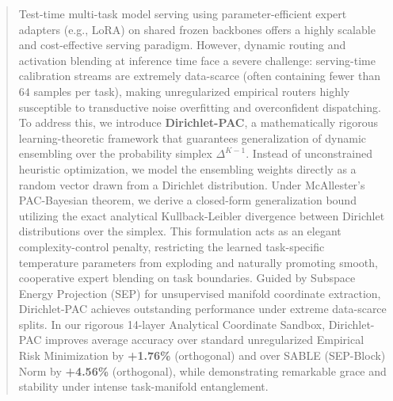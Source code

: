 \begin{abstract}
Test-time multi-task model serving using parameter-efficient expert adapters (e.g., LoRA) on shared frozen backbones offers a highly scalable and cost-effective serving paradigm. However, dynamic routing and activation blending at inference time face a severe challenge: serving-time calibration streams are extremely data-scarce (often containing fewer than $64$ samples per task), making unregularized empirical routers highly susceptible to transductive noise overfitting and overconfident dispatching. To address this, we introduce \textbf{Dirichlet-PAC}, a mathematically rigorous learning-theoretic framework that guarantees generalization of dynamic ensembling over the probability simplex $\Delta^{K-1}$. Instead of unconstrained heuristic optimization, we model the ensembling weights directly as a random vector drawn from a Dirichlet distribution. Under McAllester's PAC-Bayesian theorem, we derive a closed-form generalization bound utilizing the exact analytical Kullback-Leibler divergence between Dirichlet distributions over the simplex. This formulation acts as an elegant complexity-control penalty, restricting the learned task-specific temperature parameters from exploding and naturally promoting smooth, cooperative expert blending on task boundaries. Guided by Subspace Energy Projection (SEP) for unsupervised manifold coordinate extraction, Dirichlet-PAC achieves outstanding performance under extreme data-scarce splits. In our rigorous 14-layer Analytical Coordinate Sandbox, Dirichlet-PAC improves average accuracy over standard unregularized Empirical Risk Minimization by \textbf{+1.76\%} (orthogonal) and over SABLE (SEP-Block) Norm by \textbf{+4.56\%} (orthogonal), while demonstrating remarkable grace and stability under intense task-manifold entanglement.
\end{abstract}
